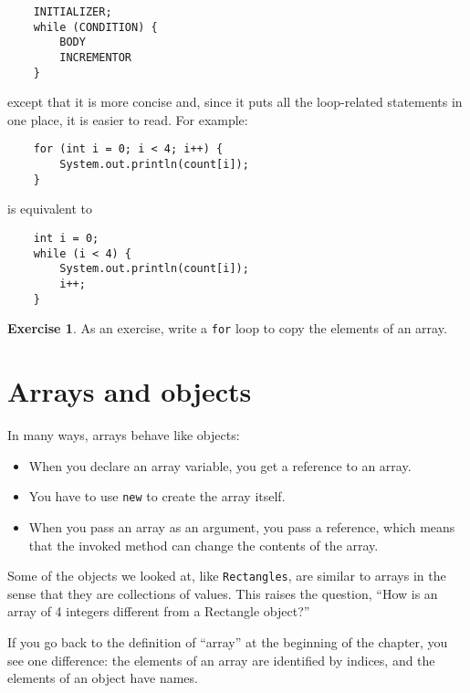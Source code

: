 \documentclass[12pt]{book}
\theoremstyle{definition}
\newtheorem{excz}{Exercise}[chapter]
\newenvironment{exercise}{\bigskip\begin{excz}\mbox{}}{\end{excz}}
\begin{document}
\begin{lstlisting}
    INITIALIZER;
    while (CONDITION) {
        BODY
        INCREMENTOR
    }
\end{lstlisting}
%
except that it is more concise and, since it puts all the
loop-related statements in one place, it is easier to read.
For example:

\begin{lstlisting}
    for (int i = 0; i < 4; i++) {
        System.out.println(count[i]);
    }
\end{lstlisting}
%
is equivalent to 

\begin{lstlisting}
    int i = 0;
    while (i < 4) {
        System.out.println(count[i]);
        i++;
    }
\end{lstlisting}

\begin{exercise}
As an exercise, write a {\tt for} loop to copy the elements
of an array.
\end{exercise}


\section{Arrays and objects}

In many ways, arrays behave like objects:

\begin{itemize}

\item When you declare an array variable, you get a reference
to an array.

\item You have to use {\tt new} to create the array itself.

\item When you pass an array as an argument, you pass a reference,
which means that the invoked method can change the contents
of the array.

\end{itemize}

Some of the objects we looked at, like {\tt Rectangles}, are
similar to arrays in the sense that they are collections of
values.  This raises the question, ``How is an array of 4 integers
different from a Rectangle object?''

If you go back to the definition of ``array'' at the beginning
of the chapter, you see one difference: the
elements of an array are identified by indices, and the
elements of an object have names.
\end{document}
